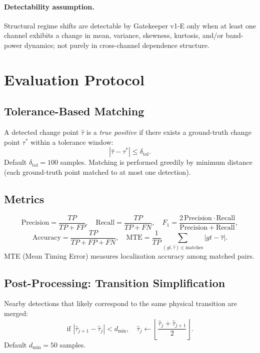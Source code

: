 \documentclass{article}
\begin{document}
\paragraph{Detectability assumption.}
Structural regime shifts are detectable by Gatekeeper v1-E only when at least one channel exhibits
a change in mean, variance, skewness, kurtosis, and/or band-power dynamics; not purely in
cross-channel dependence structure.

\section{Evaluation Protocol}

\subsection{Tolerance-Based Matching}
A detected change point $\hat{\tau}$ is a \emph{true positive} if there exists a ground-truth
change point $\tau^*$ within a tolerance window:
\[
|\hat{\tau} - \tau^*| \le \delta_{\mathrm{tol}}.
\]
Default $\delta_{\mathrm{tol}} = 100$ samples. Matching is performed greedily by minimum distance
(each ground-truth point matched to at most one detection).

\subsection{Metrics}
\[
\mathrm{Precision} = \frac{TP}{TP+FP},\quad
\mathrm{Recall} = \frac{TP}{TP+FN},\quad
F_1 = \frac{2\,\mathrm{Precision}\cdot\mathrm{Recall}}{\mathrm{Precision}+\mathrm{Recall}},
\]
\[
\mathrm{Accuracy} = \frac{TP}{TP+FP+FN},\quad
\mathrm{MTE} = \frac{1}{TP}\sum_{(gt, \hat\tau)\in\text{matches}} |gt - \hat\tau|.
\]
MTE (Mean Timing Error) measures localization accuracy among matched pairs.

\subsection{Post-Processing: Transition Simplification}
Nearby detections that likely correspond to the same physical transition are merged:
\[
\text{if } |\hat{\tau}_{j+1} - \hat{\tau}_j| < d_{\min},\quad
\hat{\tau}_j \leftarrow \left\lfloor\frac{\hat{\tau}_j + \hat{\tau}_{j+1}}{2}\right\rfloor.
\]
Default $d_{\min} = 50$ samples.

\end{document}
